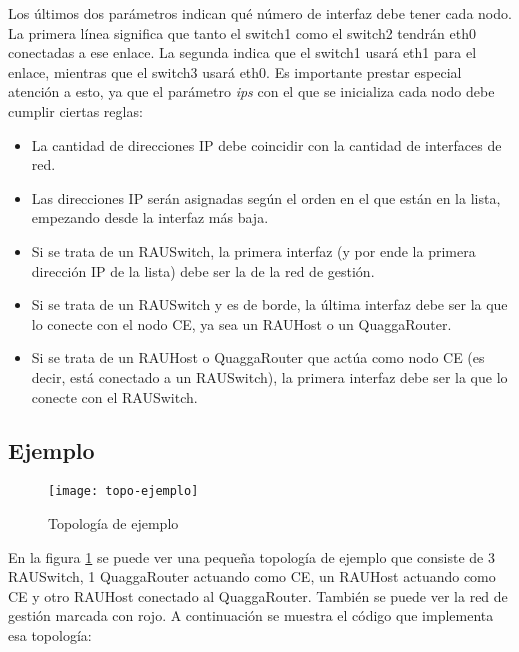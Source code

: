 Los últimos dos parámetros indican qué número de interfaz debe tener cada nodo. La primera línea significa que tanto el switch1 como el switch2 tendrán eth0 conectadas a ese enlace. La segunda indica que el switch1 usará eth1 para el enlace, mientras que el switch3 usará eth0. Es importante prestar especial atención a esto, ya que el parámetro \textit{ips} con el que se inicializa cada nodo debe cumplir ciertas reglas:
\begin{itemize}
	\item La cantidad de direcciones IP debe coincidir con la cantidad de interfaces de red.
	\item Las direcciones IP serán asignadas según el orden en el que están en la lista, empezando desde la interfaz más baja.
	\item Si se trata de un RAUSwitch, la primera interfaz (y por ende la primera dirección IP de la lista) debe ser la de la red de gestión.
	\item Si se trata de un RAUSwitch y es de borde, la última interfaz debe ser la que lo conecte con el nodo CE, ya sea un RAUHost o un QuaggaRouter.
	\item Si se trata de un RAUHost o QuaggaRouter que actúa como nodo CE (es decir, está conectado a un RAUSwitch), la primera interfaz debe ser la que lo conecte con el RAUSwitch.
\end{itemize}

\subsection{Ejemplo}
\begin{figure}[t]
	\caption{Topología de ejemplo}
	\texttt{[image: topo-ejemplo]}
	\centering
	\label{fig:topo_ejemplo}
\end{figure}

En la figura \ref{fig:topo_ejemplo} se puede ver una pequeña topología de ejemplo que consiste de 3 RAUSwitch, 1 QuaggaRouter actuando como CE, un RAUHost actuando como CE y otro RAUHost conectado al QuaggaRouter. También se puede ver la red de gestión marcada con rojo. A continuación se muestra el código que implementa esa topología:

